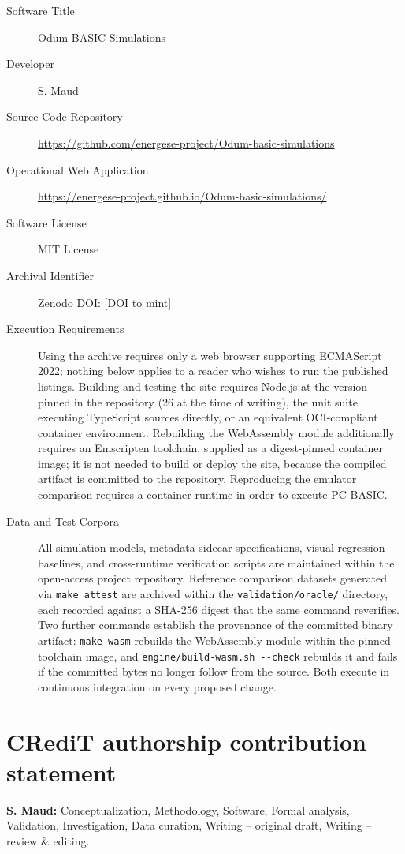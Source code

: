 \documentclass[11pt,a4paper]{article}
\begin{document}
\begin{description}
\item[Software Title] Odum BASIC Simulations
\item[Developer] S. Maud
\item[Source Code Repository] \url{https://github.com/energese-project/Odum-basic-simulations}
\item[Operational Web Application] \url{https://energese-project.github.io/Odum-basic-simulations/}
\item[Software License] MIT License
\item[Archival Identifier] Zenodo DOI: [DOI to mint]
\item[Execution Requirements] Using the archive requires only a web browser supporting ECMAScript 2022; nothing below applies to a reader who wishes to run the published listings. Building and testing the site requires Node.js at the version pinned in the repository (26 at the time of writing), the unit suite executing TypeScript sources directly, or an equivalent OCI-compliant container environment. Rebuilding the WebAssembly module additionally requires an Emscripten toolchain, supplied as a digest-pinned container image; it is not needed to build or deploy the site, because the compiled artifact is committed to the repository. Reproducing the emulator comparison requires a container runtime in order to execute PC-BASIC.
\item[Data and Test Corpora] All simulation models, metadata sidecar specifications, visual regression baselines, and cross-runtime verification scripts are maintained within the open-access project repository. Reference comparison datasets generated via \texttt{make attest} are archived within the \texttt{validation/oracle/} directory, each recorded against a SHA-256 digest that the same command reverifies. Two further commands establish the provenance of the committed binary artifact: \texttt{make wasm} rebuilds the WebAssembly module within the pinned toolchain image, and \texttt{engine/build-wasm.sh -{}-check} rebuilds it and fails if the committed bytes no longer follow from the source. Both execute in continuous integration on every proposed change.
\end{description}

\section*{CRediT authorship contribution statement}
\textbf{S. Maud:} Conceptualization, Methodology, Software, Formal analysis, Validation, Investigation, Data curation, Writing -- original draft, Writing -- review \& editing.
\end{document}
